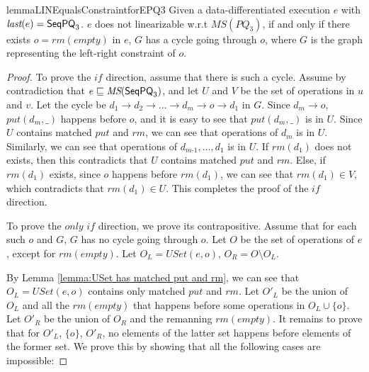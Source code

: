 \begin{restatable}{lemma}{LINEqualsConstraintforEPQ3}
\label{lemma:Lin Equals Constraint for EPQ3}
Given a data-differentiated execution $e$ with $\textit{last}(e) = \mathsf{SeqPQ}_3$. $e$ does not linearizable w.r.t $\textit{MS}(\textit{PQ}_3)$, if and only if there exists $o = \textit{rm}(\textit{empty})$ in $e$, $G$ has a cycle going through $o$, where $G$ is the graph representing the left-right constraint of $o$.
\end{restatable}

\begin {proof}

To prove the $\textit{if}$ direction, assume that there is such a cycle. Assume by contradiction that $e \sqsubseteq \textit{MS}(\mathsf{SeqPQ}_3)$, and let $U$ and $V$ be the set of operations in $u$ and $v$. Let the cycle be $d_1 \rightarrow d_2 \rightarrow \ldots \rightarrow d_m \rightarrow o \rightarrow d_1$ in $G$. Since $d_m \rightarrow o$, $\textit{put}(d_m,\_)$ happens before $o$, and it is easy to see that $\textit{put}(d_m,\_)$ is in $U$. Since $U$ contains matched $\textit{put}$ and $\textit{rm}$, we can see that operations of $d_m$ is in $U$. Similarly, we can see that operations of $d_{\textit{m-1}},\ldots,d_1$ is in $U$. If $\textit{rm}(d_1)$ does not exists, then this contradicts that $U$ contains matched $\textit{put}$ and $\textit{rm}$. Else, if $\textit{rm}(d_1)$ exists, since $o$ happens before $\textit{rm}(d_1)$, we can see that $\textit{rm}(d_1) \in V$, which contradicts that $\textit{rm}(d_1) \in U$. This completes the proof of the $\textit{if}$ direction.

To prove the $\textit{only if}$ direction, we prove its contrapositive. Assume that for each such $o$ and $G$, $G$ has no cycle going through $o$. Let $O$ be the set of operations of $e$, except for $\textit{rm}(\textit{empty})$. Let $O_L = \textit{USet}(e,o)$, $O_R = O \setminus O_L$.

By Lemma \ref{lemma:USet has matched put and rm}, we can see that $O_L = \textit{USet}(e,o)$ contains only matched $\textit{put}$ and $\textit{rm}$. Let $O'_L$ be the union of $O_L$ and all the $\textit{rm}(\textit{empty})$ that happens before some operations in $O_L \cup \{ o \}$. Let $O'_R$ be the union of $O_R$ and the remanning $\textit{rm}(\textit{empty})$. It remains to prove that for $O'_L$, $\{ o \}$, $O'_R$, no elements of the latter set happens before elements of the former set. We prove this by showing that all the following cases are impossible:


\end{proof}
